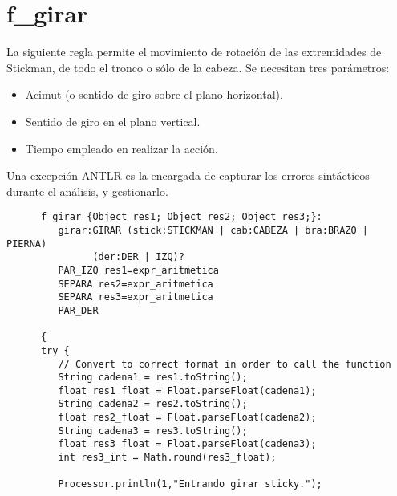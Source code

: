    \section{f\_girar}
   La siguiente regla permite el movimiento de rotación de las extremidades de Stickman, de todo el tronco o sólo de la cabeza.
   Se necesitan tres parámetros:
   \begin{itemize}
      \item Acimut (o sentido de giro sobre el plano horizontal).
      \item Sentido de giro en el plano vertical.
      \item Tiempo empleado en realizar la acción.
   \end{itemize}
   Una excepción ANTLR es la encargada de capturar los errores sintácticos durante el análisis,  y gestionarlo.
   \begin{lstlisting}
      f_girar {Object res1; Object res2; Object res3;}: 
         girar:GIRAR (stick:STICKMAN | cab:CABEZA | bra:BRAZO | PIERNA) 
               (der:DER | IZQ)?
         PAR_IZQ res1=expr_aritmetica 
         SEPARA res2=expr_aritmetica 
         SEPARA res3=expr_aritmetica 
         PAR_DER
         
      {
      try {
         // Convert to correct format in order to call the function
         String cadena1 = res1.toString(); 
         float res1_float = Float.parseFloat(cadena1);
         String cadena2 = res2.toString(); 
         float res2_float = Float.parseFloat(cadena2);
         String cadena3 = res3.toString(); 
         float res3_float = Float.parseFloat(cadena3);
         int res3_int = Math.round(res3_float);

         Processor.println(1,"Entrando girar sticky.");      


\end{lstlisting}
